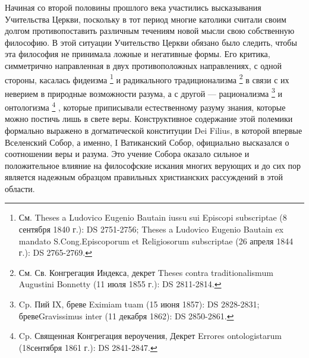 \documentclass[a5paper,10pt]{article}
\begin{document}
Начиная со второй половины прошлого века участились высказывания Учительства
Церкви, поскольку в тот период многие католики считали своим долгом
противопоставить различным течениям новой мысли свою собственную философию. В
этой ситуации Учительство Церкви обязано было следить, чтобы эта философия не
принимала ложные и негативные формы. Его критика, симметрично направленная в
двух противоположных направлениях, с одной стороны, касалась фидеизма
\footnote{См. Theses a Ludovico Eugenio Bautain iussu sui Episcopi subscriptae
    (8 сентября 1840 г.): DS 2751-2756; Theses a Ludovico Eugenio Bautain ex
    mandato S.Cong.Episcoporum et Religiosorum subscriptae (26 апреля 1844 г.):
    DS 2765-2769.}  и радикального традиционализма \footnote{См. Св.
Конгрегация Индекса, декрет Theses contra traditionalismum Augustini Bonnetty
(11 июля 1855 г.): DS 2811-2814.}  в связи с их неверием в природные
возможности разума, а с другой — рационализма \footnote{Cp. Пий IX, бреве
    Eximiam tuam (15 июня 1857): DS 2828-2831; бревеGravissimus inter (11
декабря 1862): DS 2850-2861.} и онтологизма \footnote{Cp. Священная Конгрегация
вероучения, Декрет Errores ontologistarum (18сентября 1861 г.): DS 2841-2847.}
, которые приписывали естественному разуму знания, которые можно постичь лишь в
свете веры.  Конструктивное содержание этой полемики формально выражено в
догматической конституции Dei Filius, в которой впервые Вселенский Собор, а
именно, I Ватиканский Собор, официально высказался о соотношении веры и разума.
Это учение Собора оказало сильное и положительное влияние на философские
искания многих верующих и до сих пор является надежным образцом правильных
христианских рассуждений в этой области.
\end{document}
